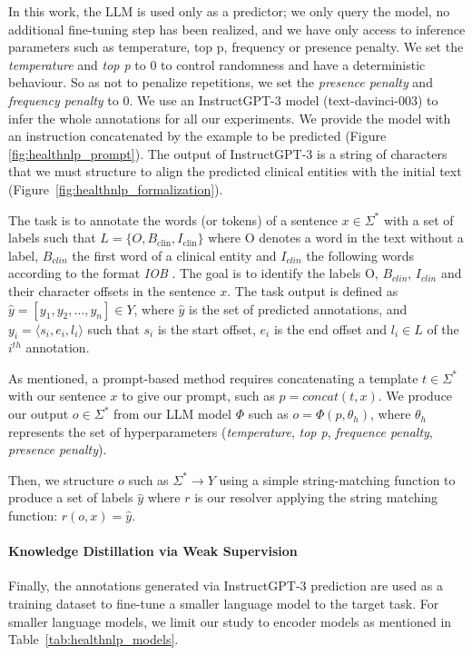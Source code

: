 In this work, the LLM is used only as a predictor; we only query the model, no additional fine-tuning step has been realized, and we have only access to inference parameters such as temperature, top p, frequency or presence penalty. We set the \textit{temperature} and \textit{top p} to 0 to control randomness and have a deterministic behaviour. So as not to penalize repetitions, we set the \textit{presence penalty} and \textit{frequency penalty} to 0. We use an InstructGPT-3 model (text-davinci-003) \citep{Ouyang2022TrainingFeedback} to infer the whole annotations for all our experiments.
We provide the model with an instruction concatenated by the example to be predicted (Figure \ref{fig:healthnlp_prompt}). The output of InstructGPT-3 is a string of characters that we must structure to align the predicted clinical entities with the initial text (Figure~\ref{fig:healthnlp_formalization}).

The task is to annotate the words (or tokens) of a sentence $x \in \Sigma^*$ with a set of labels such that $L=\{O, B_\text{clin}, I_{\text{clin}}\}$ where O denotes a word in the text without a label, $B_{clin}$ the first word of a clinical entity and $I_{clin}$ the following words according to the format \textit{IOB} \citep{Ramshaw1995TextLearning}. The goal is to identify the labels O, $B_{clin}$, $I_{clin}$ and their character offsets in the sentence $x$. The task output is defined as $\hat{y}=[ y_1, y_2, \ldots, y_n ] \in Y$, where $\hat{y}$ is the set of predicted annotations, and $y_i= \langle s_i, e_i, l_i
\rangle$ such that $s_i$ is the start offset, $e_i$ is the end offset and $l_i\in L$ of the $i^{th}$ annotation.


As mentioned, a prompt-based method requires concatenating a template $t \in \Sigma^*$ with our sentence $x$ to give our prompt, such as $p=concat(t,x)$. 
We produce our output $o \in \Sigma^*$ from our LLM model $\Phi$ such as $o=\Phi(p, \theta_h)$, where $\theta_h$ represents the set of hyperparameters (\textit{temperature}, \textit{top p}, \textit{frequence penalty}, \textit{presence penalty}).

Then, we structure $o$ such as $\Sigma^* \rightarrow Y$ using a simple string-matching function to produce a set of labels $\hat{y}$ where $r$ is our resolver applying the string matching function: $r(o, x)=\hat{y}$.

\paragraph{Knowledge Distillation via Weak Supervision} Finally, the annotations generated via InstructGPT-3 prediction are used as a training dataset to fine-tune a smaller language model to the target task. For smaller language models, we limit our study to encoder models as mentioned in Table~\ref{tab:healthnlp_models}.

